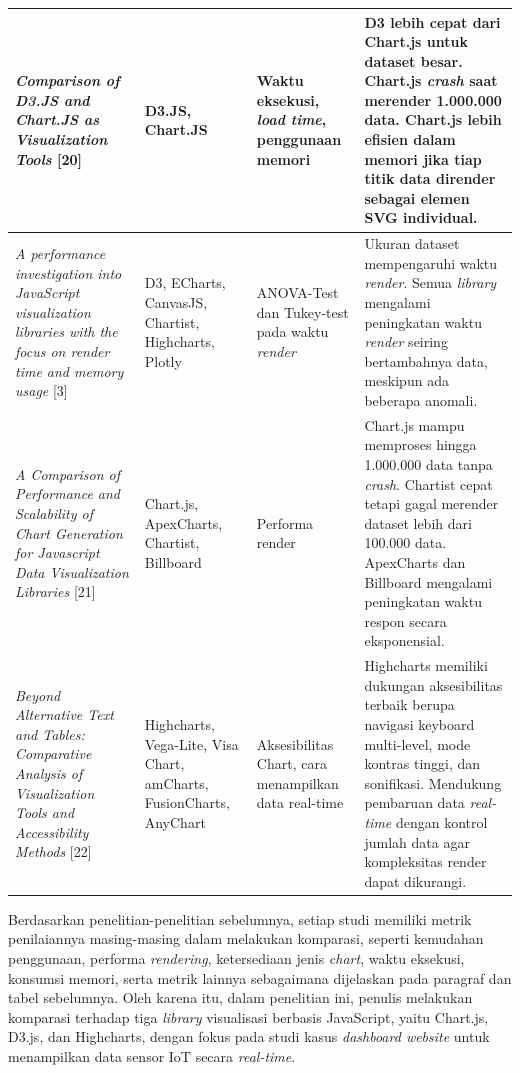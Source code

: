 \begin{longtable}{|p{2.5cm}|p{2.3cm}|p{3cm}|p{4.5cm}|}
	\textit{Comparison of D3.JS and Chart.JS as Visualization Tools} [20] 
	& D3.JS, Chart.JS 
	& Waktu eksekusi, \textit{load time}, penggunaan memori 
	& D3 lebih cepat dari Chart.js untuk dataset besar. Chart.js \textit{crash} saat merender 1.000.000 data. Chart.js lebih efisien dalam memori jika tiap titik data dirender sebagai elemen SVG individual. \\
	\hline
	
	\textit{A performance investigation into JavaScript visualization libraries with the focus on render time and memory usage} [3] 
	& D3, ECharts, CanvasJS, Chartist, Highcharts, Plotly 
	& ANOVA-Test dan Tukey-test pada waktu \textit{render} 
	& Ukuran dataset mempengaruhi waktu \textit{render}. Semua \textit{library} mengalami peningkatan waktu \textit{render} seiring bertambahnya data, meskipun ada beberapa anomali. \\
	\hline
	
	\textit{A Comparison of Performance and Scalability of Chart Generation for Javascript Data Visualization Libraries} [21] 
	& Chart.js, ApexCharts, Chartist, Billboard 
	& Performa render 
	& Chart.js mampu memproses hingga 1.000.000 data tanpa \textit{crash}. Chartist cepat tetapi gagal merender dataset lebih dari 100.000 data. ApexCharts dan Billboard mengalami peningkatan waktu respon secara eksponensial. \\
	\hline
	
	\textit{Beyond Alternative Text and Tables: Comparative Analysis of Visualization Tools and Accessibility Methods} [22] 
	& Highcharts, Vega-Lite, Visa Chart, amCharts, FusionCharts, AnyChart 
	& Aksesibilitas Chart, cara menampilkan data real-time 
	& Highcharts memiliki dukungan aksesibilitas terbaik berupa navigasi keyboard multi-level, mode kontras tinggi, dan sonifikasi. Mendukung pembaruan data \textit{real-time} dengan kontrol jumlah data agar kompleksitas render dapat dikurangi. \\
	\hline
	
\end{longtable}

	

Berdasarkan penelitian-penelitian sebelumnya, setiap studi memiliki metrik penilaiannya masing-masing dalam melakukan komparasi, seperti kemudahan penggunaan, performa \textit{rendering}, ketersediaan jenis \textit{chart}, waktu eksekusi, konsumsi memori, serta metrik lainnya sebagaimana dijelaskan pada paragraf dan tabel sebelumnya. Oleh karena itu, dalam penelitian ini, penulis melakukan komparasi terhadap tiga \textit{library} visualisasi berbasis JavaScript, yaitu Chart.js, D3.js, dan Highcharts, dengan fokus pada studi kasus \textit{dashboard website} untuk menampilkan data sensor IoT secara \textit{real-time}.

